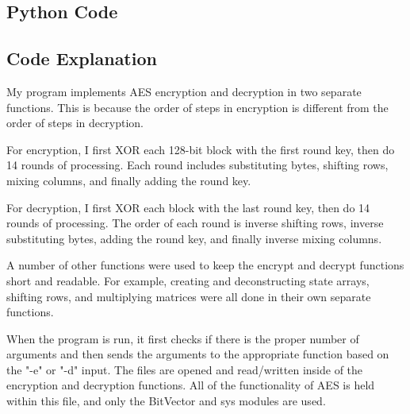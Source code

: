 \documentclass[11pt]{article}
\begin{document}
\subsection{Python Code}

\pagebreak

\subsection{Code Explanation}

My program implements AES encryption and decryption in two separate functions. This is because the order of steps in encryption is different from the order of steps in decryption. 

For encryption, I first XOR each 128-bit block with the first round key, then do 14 rounds of processing. Each round includes substituting bytes, shifting rows, mixing columns, and finally adding the round key. 

For decryption, I first XOR each block with the last round key, then do 14 rounds of processing. The order of each round is inverse shifting rows, inverse substituting bytes, adding the round key, and finally inverse mixing columns.

A number of other functions were used to keep the encrypt and decrypt functions short and readable. For example, creating and deconstructing state arrays, shifting rows, and multiplying matrices were all done in their own separate functions.

When the program is run, it first checks if there is the proper number of arguments and then sends the arguments to the appropriate function based on the "-e" or "-d" input. The files are opened and read/written inside of the encryption and decryption functions. All of the functionality of AES is held within this file, and only the BitVector and sys modules are used.
\end{document}
